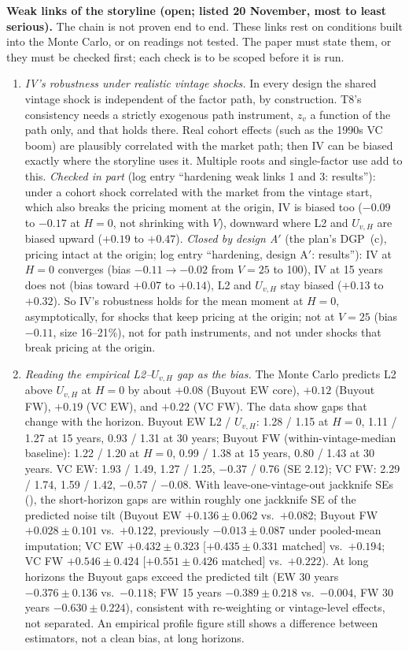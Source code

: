 \documentclass[11pt]{article}
\newcommand{\file}[1]{\path{#1}}
\begin{document}
\textbf{Weak links of the storyline (open; listed 20 November, most to least serious).} The chain is not proven end to end. These links rest on conditions built into the Monte Carlo, or on readings not tested. The paper must state them, or they must be checked first; each check is to be scoped before it is run.
\begin{enumerate}
\item \emph{IV's robustness under realistic vintage shocks.} In every design the shared vintage shock is independent of the factor path, by construction. T8's consistency needs a strictly exogenous path instrument, $z_v$ a function of the path only, and that holds there. Real cohort effects (such as the 1990s VC boom) are plausibly correlated with the market path; then IV can be biased exactly where the storyline uses it. Multiple roots and single-factor use add to this. \emph{Checked in part} (log entry ``hardening weak links 1 and 3: results''): under a cohort shock correlated with the market from the vintage start, which also breaks the pricing moment at the origin, IV is biased too ($-0.09$ to $-0.17$ at $H=0$, not shrinking with $V$), downward where L2 and $U_{v,H}$ are biased upward ($+0.19$ to $+0.47$). \emph{Closed by design A$'$} (the plan's DGP~(c), pricing intact at the origin; log entry ``hardening, design A$'$: results''): IV at $H=0$ converges (bias $-0.11\to-0.02$ from $V=25$ to 100), IV at 15 years does not (bias toward $+0.07$ to $+0.14$), L2 and $U_{v,H}$ stay biased ($+0.13$ to $+0.32$). So IV's robustness holds for the mean moment at $H=0$, asymptotically, for shocks that keep pricing at the origin; not at $V=25$ (bias $-0.11$, size 16--21\%), not for path instruments, and not under shocks that break pricing at the origin.
\item \emph{Reading the empirical L2--$U_{v,H}$ gap as the bias.} The Monte Carlo predicts L2 above $U_{v,H}$ at $H=0$ by about $+0.08$ (Buyout EW core), $+0.12$ (Buyout FW), $+0.19$ (VC EW), and $+0.22$ (VC FW). The data show gaps that change with the horizon. Buyout EW L2 / $U_{v,H}$: 1.28 / 1.15 at $H=0$, 1.11 / 1.27 at 15 years, 0.93 / 1.31 at 30 years; Buyout FW (within-vintage-median baseline): 1.22 / 1.20 at $H=0$, 0.99 / 1.38 at 15 years, 0.80 / 1.43 at 30 years. VC EW: 1.93 / 1.49, 1.27 / 1.25, $-0.37$ / 0.76 (SE 2.12); VC FW: 2.29 / 1.74, 1.59 / 1.42, $-0.57$ / $-0.08$. With leave-one-vintage-out jackknife SEs (\file{iv_comparison_rows.csv}), the short-horizon gaps are within roughly one jackknife SE of the predicted noise tilt (Buyout EW $+0.136\pm0.062$ vs.\ $+0.082$; Buyout FW $+0.028\pm0.101$ vs.\ $+0.122$, previously $-0.013\pm0.087$ under pooled-mean imputation; VC EW $+0.432\pm0.323$ [$+0.435\pm0.331$ matched] vs.\ $+0.194$; VC FW $+0.546\pm0.424$ [$+0.551\pm0.426$ matched] vs.\ $+0.222$). At long horizons the Buyout gaps exceed the predicted tilt (EW 30 years $-0.376\pm0.136$ vs.\ $-0.118$; FW 15 years $-0.389\pm0.218$ vs.\ $-0.004$, FW 30 years $-0.630\pm0.224$), consistent with re-weighting or vintage-level effects, not separated. An empirical profile figure still shows a difference between estimators, not a clean bias, at long horizons.

\end{enumerate}
\end{document}
